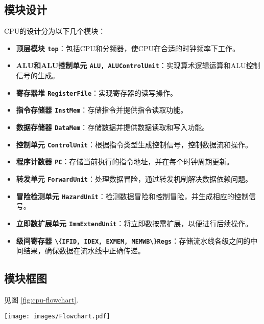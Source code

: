 \subsection{模块设计}
CPU的设计分为以下几个模块：
\begin{itemize}
    \item \textbf{顶层模块 \lstinline|top|}：包括CPU和分频器，使CPU在合适的时钟频率下工作。
    \item \textbf{ALU和ALU控制单元 \lstinline|ALU, ALUControlUnit|}：实现算术逻辑运算和ALU控制信号的生成。
    \item \textbf{寄存器堆 \lstinline|RegisterFile|}：实现寄存器的读写操作。
    \item \textbf{指令存储器 \lstinline|InstMem|}：存储指令并提供指令读取功能。
    \item \textbf{数据存储器 \lstinline|DataMem|}：存储数据并提供数据读取和写入功能。
    \item \textbf{控制单元 \lstinline|ControlUnit|}：根据指令类型生成控制信号，控制数据流和操作。
    \item \textbf{程序计数器 \lstinline|PC|}：存储当前执行的指令地址，并在每个时钟周期更新。
    \item \textbf{转发单元 \lstinline|ForwardUnit|}：处理数据冒险，通过转发机制解决数据依赖问题。
    \item \textbf{冒险检测单元 \lstinline|HazardUnit|}：检测数据冒险和控制冒险，并生成相应的控制信号。
    \item \textbf{立即数扩展单元 \lstinline|ImmExtendUnit|}：将立即数按需扩展，以便进行后续操作。
    \item \textbf{级间寄存器 \lstinline|\{IFID, IDEX, EXMEM, MEMWB\}Regs|}：存储流水线各级之间的中间结果，确保数据在流水线中正确传递。
\end{itemize}
    
\subsection{模块框图}
见图 \ref{fig:cpu-flowchart}.
\begin{figure*}[h]
    \centering
    \texttt{[image: images/Flowchart.pdf]}
    \caption{CPU模块框图}
    \label{fig:cpu-flowchart}
\end{figure*}
